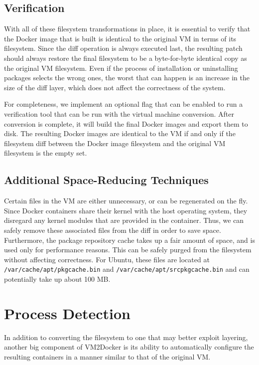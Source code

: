 \subsection{Verification}

With all of these filesystem transformations in place, it is essential to verify that the Docker image that is built is identical to the original VM in terms of its filesystem. Since the diff operation is always executed last, the resulting patch should always restore the final filesystem to be a byte-for-byte identical copy as the original VM filesystem. Even if the process of installation or uninstalling packages selects the wrong ones, the worst that can happen is an increase in the size of the diff layer, which does not affect the correctness of the system.

For completeness, we implement an optional flag that can be enabled to run a verification tool that can be run with the virtual machine conversion. After conversion is complete, it will build the final Docker images and export them to disk. The resulting Docker images are identical to the VM if and only if the filesystem diff between the Docker image filesystem and the original VM filesystem is the empty set.

\subsection{Additional Space-Reducing Techniques}
\label{sec:addnltechs}
Certain files in the VM are either unnecessary, or can be regenerated on the fly. Since Docker containers share their kernel with the host operating system, they disregard any kernel modules that are provided in the container. Thus, we can safely remove these associated files from the diff in order to save space. Furthermore, the package repository cache takes up a fair amount of space, and is used only for performance reasons. This can be safely purged from the filesystem without affecting correctness. For Ubuntu, these files are located at \texttt{/var/cache/apt/pkgcache.bin} and \texttt{/var/cache/apt/srcpkgcache.bin} and can potentially take up about 100 MB.

\section{Process Detection}
\label{sec:pdetection}
In addition to converting the filesystem to one that may better exploit layering, another big component of VM2Docker is its ability to automatically configure the resulting containers in a manner similar to that of the original VM.

